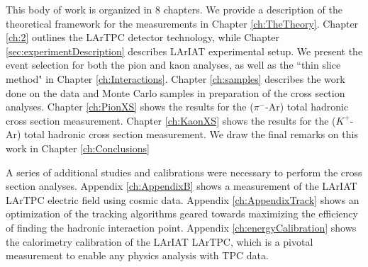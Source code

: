 This body of work is organized in 8 chapters.
We provide a description of the theoretical framework for the measurements in  Chapter \ref{ch:TheTheory}. Chapter \ref{ch:2} outlines the LArTPC detector technology, while
Chapter \ref{sec:experimentDescription} describes LArIAT experimental setup. We present the event selection for both the pion and kaon analyses, as well as the ``thin slice method" in Chapter \ref{ch:Interactions}.  Chapter \ref{ch:samples}  describes the work done on the data and Monte Carlo samples in preparation of the cross section analyses.
Chapter \ref{ch:PionXS} shows  the results for the ($\pi^-$-Ar) total hadronic cross section measurement. Chapter \ref{ch:KaonXS} shows  the results for the ($K^+$-Ar) total hadronic cross section measurement. We draw the final remarks on this work in Chapter \ref{ch:Conclusions}

A series of additional studies and calibrations were necessary to perform the cross section analyses. Appendix \ref{ch:AppendixB} shows a measurement of the LArIAT LArTPC electric field using cosmic data. Appendix \ref{ch:AppendixTrack} shows an optimization of the tracking algorithms geared towards maximizing the efficiency of finding the hadronic interaction point. Appendix \ref{ch:energyCalibration} shows the calorimetry calibration of the LArIAT LArTPC, which is a pivotal measurement to enable any physics analysis with TPC data.  


